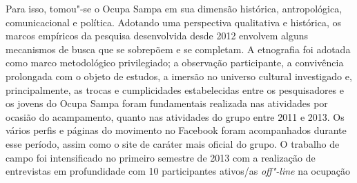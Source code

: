 Para isso, tomou"-se o Ocupa Sampa em sua dimensão histórica,
antropológica, comunicacional e política. Adotando uma perspectiva
qualitativa e histórica, os marcos empíricos da pesquisa desenvolvida
desde 2012 envolvem alguns mecanismos de busca que se sobrepõem e se
completam. A etnografia foi adotada como marco metodológico
privilegiado; a observação participante, a convivência prolongada com o
objeto de estudos, a imersão no universo cultural investigado e,
principalmente, as trocas e cumplicidades estabelecidas entre os
pesquisadores e os jovens do Ocupa Sampa foram fundamentais realizada
nas atividades por ocasião do acampamento, quanto nas atividades do
grupo entre 2011 e 2013. Os vários perfis e páginas do movimento no
Facebook foram acompanhados durante esse período, assim como o site de
caráter mais oficial do grupo. O trabalho de campo foi intensificado no
primeiro semestre de 2013 com a realização de entrevistas em
profundidade com 10 participantes ativos/as \emph{off"-line} na ocupação
